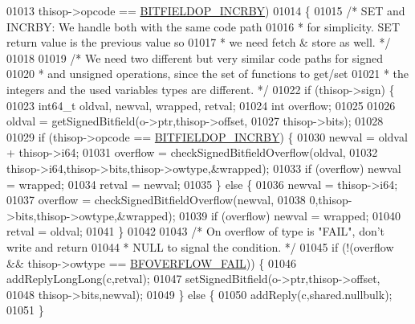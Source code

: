 \begin{DoxyCode}
{01013             thisop->opcode == \hyperlink{bitops_8c_aa91cdbb6feffa6f3ef145e62f0fb7706}{BITFIELDOP\_INCRBY})
01014         \{
01015             \textcolor{comment}{/* SET and INCRBY: We handle both with the same code path}
01016 \textcolor{comment}{             * for simplicity. SET return value is the previous value so}
01017 \textcolor{comment}{             * we need fetch & store as well. */}
01018 
01019             \textcolor{comment}{/* We need two different but very similar code paths for signed}
01020 \textcolor{comment}{             * and unsigned operations, since the set of functions to get/set}
01021 \textcolor{comment}{             * the integers and the used variables types are different. */}
01022             \textcolor{keywordflow}{if} (thisop->sign) \{
01023                 int64\_t oldval, newval, wrapped, retval;
01024                 \textcolor{keywordtype}{int} overflow;
01025 
01026                 oldval = getSignedBitfield(o->ptr,thisop->offset,
01027                         thisop->bits);
01028 
01029                 \textcolor{keywordflow}{if} (thisop->opcode == \hyperlink{bitops_8c_aa91cdbb6feffa6f3ef145e62f0fb7706}{BITFIELDOP\_INCRBY}) \{
01030                     newval = oldval + thisop->i64;
01031                     overflow = checkSignedBitfieldOverflow(oldval,
01032                             thisop->i64,thisop->bits,thisop->owtype,&wrapped);
01033                     \textcolor{keywordflow}{if} (overflow) newval = wrapped;
01034                     retval = newval;
01035                 \} \textcolor{keywordflow}{else} \{
01036                     newval = thisop->i64;
01037                     overflow = checkSignedBitfieldOverflow(newval,
01038                             0,thisop->bits,thisop->owtype,&wrapped);
01039                     \textcolor{keywordflow}{if} (overflow) newval = wrapped;
01040                     retval = oldval;
01041                 \}
01042 
01043                 \textcolor{comment}{/* On overflow of type is "FAIL", don't write and return}
01044 \textcolor{comment}{                 * NULL to signal the condition. */}
01045                 \textcolor{keywordflow}{if} (!(overflow && thisop->owtype == \hyperlink{bitops_8c_a43973854211e7721d528708f55214302}{BFOVERFLOW\_FAIL})) \{
01046                     addReplyLongLong(c,retval);
01047                     setSignedBitfield(o->ptr,thisop->offset,
01048                                       thisop->bits,newval);
01049                 \} \textcolor{keywordflow}{else} \{
01050                     addReply(c,shared.nullbulk);
01051                 \}
}
\end{DoxyCode}
